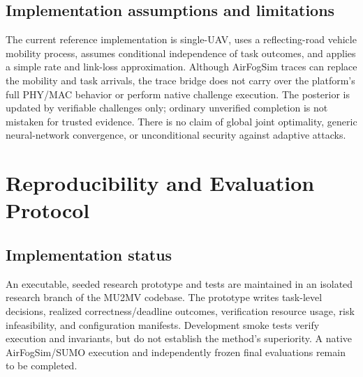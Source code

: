 \documentclass[journal]{IEEEtran}
\begin{document}
\subsection{Implementation assumptions and limitations}
The current reference implementation is single-UAV, uses a reflecting-road vehicle mobility process, assumes conditional independence of task outcomes, and applies a simple rate and link-loss approximation. Although AirFogSim traces can replace the mobility and task arrivals, the trace bridge does not carry over the platform's full PHY/MAC behavior or perform native challenge execution. The posterior is updated by verifiable challenges only; ordinary unverified completion is not mistaken for trusted evidence. There is no claim of global joint optimality, generic neural-network convergence, or unconditional security against adaptive attacks.

\section{Reproducibility and Evaluation Protocol}
\subsection{Implementation status}
An executable, seeded research prototype and tests are maintained in an isolated research branch of the MU2MV codebase. The prototype writes task-level decisions, realized correctness/deadline outcomes, verification resource usage, risk infeasibility, and configuration manifests. Development smoke tests verify execution and invariants, but do not establish the method's superiority. A native AirFogSim/SUMO execution and independently frozen final evaluations remain to be completed.
\end{document}
